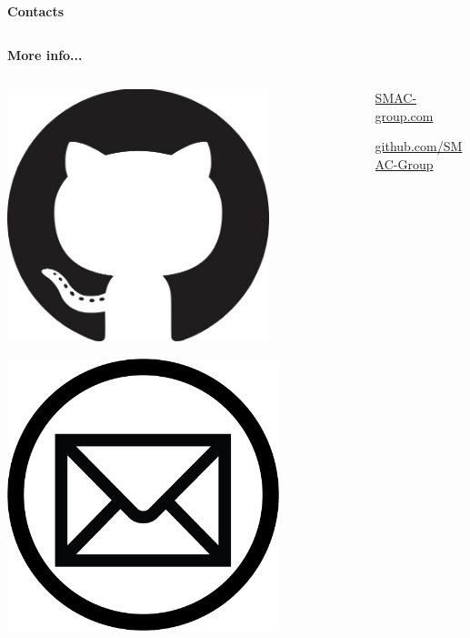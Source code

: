 \documentclass[envcountsect,usenames,dvipsnames]{beamer}
\theoremstyle{mystyle}
\begin{document}
\begin{frame}{\textbf{Contacts}}
\begin{columns}
\begin{column}{0.5\textwidth}
\begin{block}{\textbf{More info...}}
\begin{columns}
\begin{column}{0.1\textwidth}
	\includegraphics[width=0.75\textwidth]{Images/git}
	
	\vspace{0.05cm}
	
	\includegraphics[width=0.78\textwidth]{Images/mail}
	
	\end{column}
	\begin{column}{0.85\textwidth}
	
	\vspace{-0.1cm}
	
	\url{SMAC-group.com}
	
	\vspace{0.05cm}
	
	\url{github.com/SMAC-Group}
	

\end{column}
\end{columns}
\end{block}
\end{column}
\end{columns}
\end{frame}
\end{document}
